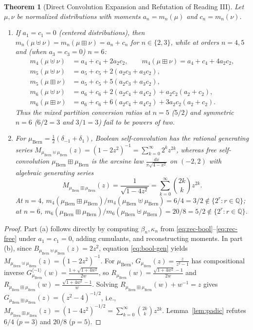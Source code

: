 \documentclass[11pt,a4paper]{article}
\newtheorem{theorem}{Theorem}[section]
\theoremstyle{definition}
\theoremstyle{remark}
\newcommand{\Bern}{\mu_{\mathrm{Bern}}}
\begin{document}
\begin{theorem}[Direct Convolution Expansion and Refutation of Reading III]\label{thm:reading3}
Let $\mu, \nu$ be normalized distributions with moments $a_n = m_n(\mu)$ and $c_n = m_n(\nu)$.
\begin{enumerate}
  \item[(a)] If $a_1 = c_1 = 0$ (centered distributions), then $m_n(\mu \uplus \nu) = m_n(\mu \boxplus \nu) = a_n + c_n$ for $n \in \{2, 3\}$, while at orders $n = 4, 5$ and (when $a_3 = c_3 = 0$) $n = 6$:
  \begin{align*}
    m_4(\mu \uplus \nu) &= a_4 + c_4 + 2 a_2 c_2, \qquad
    m_4(\mu \boxplus \nu) = a_4 + c_4 + 4 a_2 c_2,\\
    m_5(\mu \uplus \nu) &= a_5 + c_5 + 2(a_2 c_3 + a_3 c_2),\\
    m_5(\mu \boxplus \nu) &= a_5 + c_5 + 5(a_2 c_3 + a_3 c_2),\\
    m_6(\mu \uplus \nu) &= a_6 + c_6 + 2(a_2 c_4 + a_4 c_2) + a_2 c_2(a_2 + c_2),\\
    m_6(\mu \boxplus \nu) &= a_6 + c_6 + 6(a_2 c_4 + a_4 c_2) + 3 a_2 c_2(a_2 + c_2).
  \end{align*}
  Thus the mixed partition conversion ratios at $n = 5$ ($5/2$) and symmetric $n = 6$ ($6/2 = 3$ and $3/1 = 3$) fail to be powers of two.
  \item[(b)] For $\Bern = \frac{1}{2}(\delta_{-1} + \delta_1)$, Boolean self-convolution has the rational generating series $M_{\Bern \uplus \Bern}(z) = (1 - 2z^2)^{-1} = \sum_{k=0}^\infty 2^k z^{2k}$, whereas free self-convolution $\Bern \boxplus \Bern$ is the arcsine law $\frac{dx}{\pi\sqrt{4 - x^2}}$ on $(-2, 2)$ with algebraic generating series
  \[
    M_{\Bern \boxplus \Bern}(z) = \frac{1}{\sqrt{1 - 4z^2}} = \sum_{k=0}^{\infty} \binom{2k}{k} z^{2k}.
  \]
  At $n = 4$, $m_4(\Bern \boxplus \Bern)/m_4(\Bern \uplus \Bern) = 6/4 = 3/2 \notin \{2^r : r \in \mathbb{Q}\}$; at $n = 6$, $m_6(\Bern \boxplus \Bern)/m_6(\Bern \uplus \Bern) = 20/8 = 5/2 \notin \{2^r : r \in \mathbb{Q}\}$.
\end{enumerate}
\end{theorem}

\begin{proof}
Part (a) follows directly by computing $\beta_n, \kappa_n$ from \eqref{eq:rec-bool}--\eqref{eq:rec-free} under $a_1 = c_1 = 0$, adding cumulants, and reconstructing moments. In part (b), since $B_{\Bern \uplus \Bern}(z) = 2 z^2$, equation \eqref{eq:bool-gen} yields $M_{\Bern \uplus \Bern}(z) = (1 - 2z^2)^{-1}$. For $\Bern$, $G_{\Bern}(z) = \frac{z}{z^2 - 1}$ has compositional inverse $G_{\Bern}^{\langle -1 \rangle}(w) = \frac{1 + \sqrt{1 + 4w^2}}{2w}$, so $R_{\Bern}(w) = \frac{\sqrt{1 + 4w^2} - 1}{2w}$ and $R_{\Bern \boxplus \Bern}(w) = \frac{\sqrt{1 + 4w^2} - 1}{w}$. Solving $R_{\Bern \boxplus \Bern}(w) + w^{-1} = z$ gives $G_{\Bern \boxplus \Bern}(z) = (z^2 - 4)^{-1/2}$, i.e., $M_{\Bern \boxplus \Bern}(z) = (1 - 4z^2)^{-1/2} = \sum_{k=0}^\infty \binom{2k}{k} z^{2k}$. Lemma~\ref{lem:padic} refutes $6/4$ ($p = 3$) and $20/8$ ($p = 5$).
\end{proof}
\end{document}
